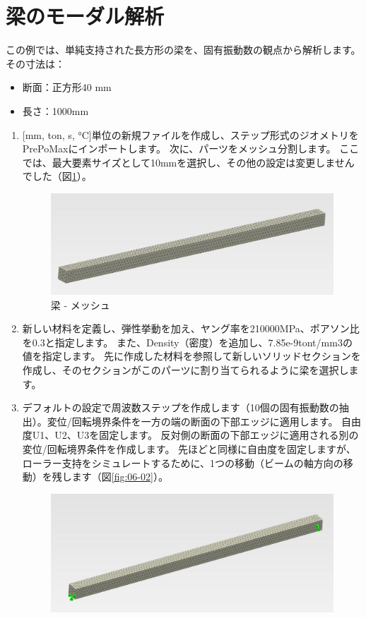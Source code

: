 \section{梁のモーダル解析}
この例では、単純支持された長方形の梁を、固有振動数の観点から解析します。その寸法は：
\begin{itemize}
\item 断面：正方形40 mm
\item 長さ：1000mm
\end{itemize}
\begin{enumerate}
\item
  {[}mm, ton, s, °C{]}単位の新規ファイルを作成し、ステップ形式のジオメトリをPrePoMaxにインポートします。
  次に、パーツをメッシュ分割します。
  ここでは、最大要素サイズとして10mmを選択し、その他の設定は変更しませんでした（図\ref{fig:06-01}）。
	\begin{figure}[H]
	\centering
	\includegraphics[width=143mm]{fig/06-01.png}
	\caption{梁 - メッシュ}
	\label{fig:06-01}
	\end{figure}
\item
  新しい材料を定義し、弾性挙動を加え、ヤング率を210000MPa、ポアソン比を0.3と指定します。
  また、Density（密度）を追加し、7.85e-9tont/mm3の値を指定します。
  先に作成した材料を参照して新しいソリッドセクションを作成し、そのセクションがこのパーツに割り当てられるように梁を選択します。
\item
  デフォルトの設定で周波数ステップを作成します（10個の固有振動数の抽出）。変位/回転境界条件を一方の端の断面の下部エッジに適用します。
  自由度U1、U2、U3を固定します。
  反対側の断面の下部エッジに適用される別の変位/回転境界条件を作成します。
  先ほどと同様に自由度を固定しますが、ローラー支持をシミュレートするために、1つの移動（ビームの軸方向の移動）を残します（図\ref{fig:06-02}）。
	\begin{figure}[H]
	\centering
	\includegraphics[width=145mm]{fig/06-02.png}

\end{figure}
\end{enumerate}
